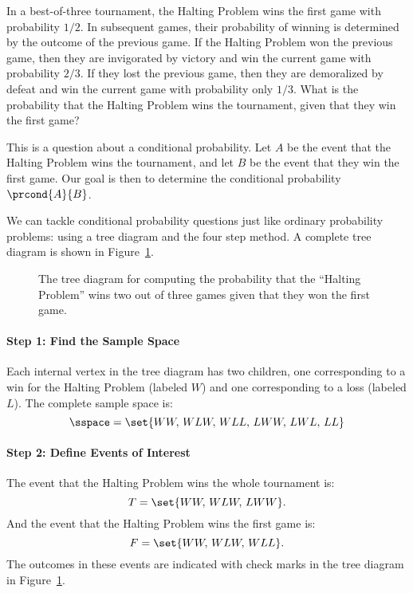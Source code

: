 In a best-of-three tournament, the Halting Problem wins the first game
with probability $1/2$.  In subsequent games, their
probability of winning is determined by the outcome of the previous
game.  If the Halting Problem won the previous game, then they are
invigorated by victory and win the current game with probability
$2/3$.  If they lost the previous game, then they are
demoralized by defeat and win the current game with probability only
$1/3$.  What is the probability that the Halting Problem wins
the tournament, given that they win the first game?


This is a question about a conditional probability.  Let $A$ be the
event that the Halting Problem wins the tournament, and let $B$ be the
event that they win the first game.  Our goal is then to determine the
conditional probability $\prcond{A}{B}$.

We can tackle conditional probability questions just like ordinary
probability problems: using a tree diagram and the four step method.
A complete tree diagram is shown in Figure~\ref{fig:15B2}.

\begin{figure}[h]



\caption{The tree diagram for computing the probability that the
  ``Halting Problem'' wins two out of three games given that they won
  the first game.}

\label{fig:15B2}

\end{figure}

\paragraph{Step 1:  Find the Sample Space}

Each internal vertex in the tree diagram has two children, one
corresponding to a win for the Halting Problem (labeled $W$) and one
corresponding to a loss (labeled $L$).  The complete sample space is:
%
\[
\sspace = \set{ WW, \, WLW,\, WLL,\, LWW,\, LWL,\, LL }
\]

\paragraph{Step 2:  Define Events of Interest}

The event that the Halting Problem wins the whole tournament is:
%
\[
    T = \set{WW,\, WLW,\, LWW}.
\]
%
And the event that the Halting Problem wins the first game is:
%
\[
    F = \set{WW,\, WLW,\, WLL }.
\]
%
The outcomes in these events are indicated with check marks in the tree
diagram in Figure~\ref{fig:15B2}.

